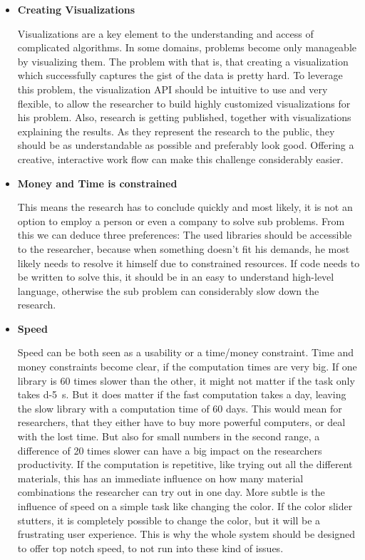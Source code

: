 \begin{itemize} 

    \item  \textbf{Creating Visualizations}

    Visualizations are a key element to the understanding and access of complicated algorithms.
    In some domains, problems become only manageable by visualizing them.
    The problem with that is, that creating a visualization which successfully captures the gist of the data is pretty hard.
    To leverage this problem, the visualization API should be intuitive to use and very flexible, to allow the researcher to build highly customized visualizations for his problem.
    Also, research is getting published, together with visualizations explaining the results. As they represent the research to the public, they should be as understandable as possible and preferably look good.
    Offering a creative, interactive work flow can make this challenge considerably easier.

    \item \textbf{Money and Time is constrained}
    
    This means the research has to conclude quickly and most likely, it is not an option to employ a person or even a company to solve sub problems.
    From this we can deduce three preferences: 
    The used libraries should be accessible to the researcher, because when something doesn't fit his demands, he most likely needs to resolve it himself due to constrained resources.
    If code needs to be written to solve this, it should be in an easy to understand high-level language, otherwise the sub problem can considerably slow down the research.

    \item \textbf{Speed}
    
    Speed can be both seen as a usability or a time/money constraint. 
    Time and money constraints become clear, if the computation times are very big. If one library is 60 times slower than the other, it might not matter if the task only takes \SI{d-5}{\second}. But it does matter if the fast computation takes a day, leaving the slow library with a computation time of 60 days.
    This would mean for researchers, that they either have to buy more powerful computers, or deal with the lost time.
    But also for small numbers in the second range, a difference of 20 times slower can have a big impact on the researchers productivity. If the computation is repetitive, like trying out all the different materials, this has an immediate influence on how many material combinations the researcher can try out in one day.
    More subtle is the influence of speed on a simple task like changing the color. If the color slider stutters, it is completely possible to change the color, but it will be a frustrating user experience. 
    This is why the whole system should be designed to offer top notch speed, to not run into these kind of issues.

\end{itemize} 
